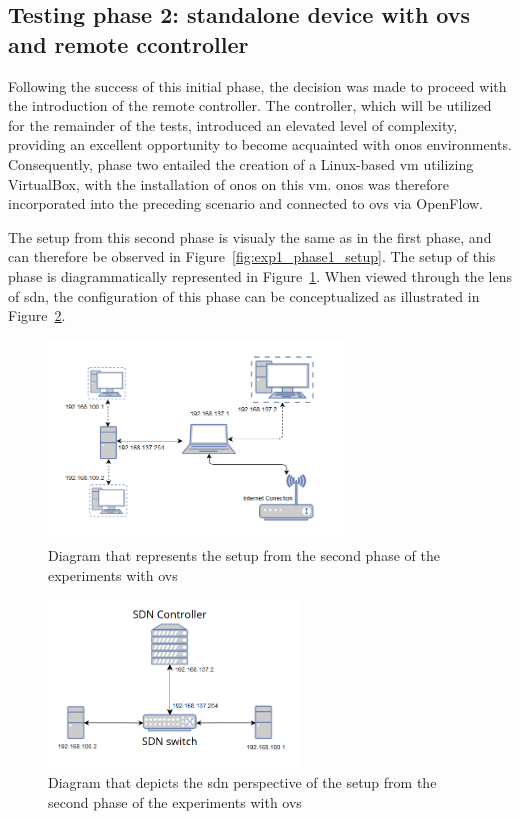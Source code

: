 \subsection[Testing phase 2: standalone device with OvS and remote ccontroller]{Testing phase 2: standalone device with \gls{ovs} and remote ccontroller}
Following the success of this initial phase, the decision was made to proceed with the introduction of the remote controller. The controller, which will be utilized for the remainder of the tests, introduced an elevated level of complexity, providing an excellent opportunity to become acquainted with \gls{onos} environments. Consequently, phase two entailed the creation of a Linux-based \gls{vm} utilizing VirtualBox, with the installation of \gls{onos} on this \gls{vm}. \gls{onos} was therefore incorporated into the preceding scenario and connected to \gls{ovs} via OpenFlow.

The setup from this second phase is visualy the same as in the first phase, and can therefore be observed in Figure~\ref{fig:exp1_phase1_setup}. The setup of this phase is diagrammatically represented in Figure~\ref{fig:exp1_phase2_diagram}. When viewed through the lens of \gls{sdn}, the configuration of this phase can be conceptualized as illustrated in Figure~\ref{fig:exp1_phase2_sdn_diagram}.

\begin{figure}
	\centering
	\includegraphics[width=0.7\textwidth]{Chapters/Figures/tests/ovs_phase_2/setup_diagram.PNG}
	\caption{Diagram that represents the setup from the second phase of the experiments with \gls{ovs}}
	\label{fig:exp1_phase2_diagram}
\end{figure}

\begin{figure}
	\centering
	\includegraphics[width=0.6\textwidth]{Chapters/Figures/tests/ovs_phase_2/sdn_diagram.PNG}
	\caption{Diagram that depicts the \gls{sdn} perspective of the setup from the second phase of the experiments with \gls{ovs}}
	\label{fig:exp1_phase2_sdn_diagram}
\end{figure}

